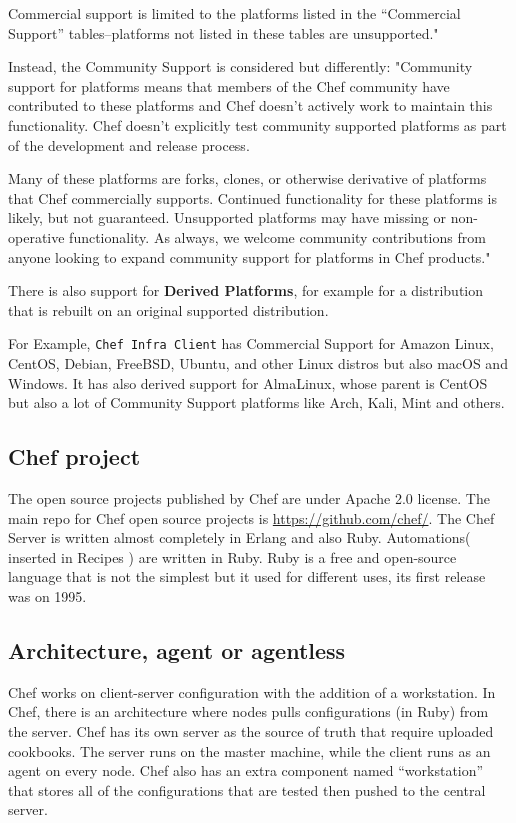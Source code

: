 \documentclass[12pt,a4paper,openright,twoside]{book}
\begin{document}
Commercial support is limited to the platforms listed in the “Commercial Support” tables–platforms not listed in these tables are unsupported."\cite{chefDocPlatforms}

Instead, the Community Support is considered but differently:
"Community support for platforms means that members of the Chef community have contributed to these platforms and Chef doesn’t actively work to maintain this functionality. Chef doesn’t explicitly test community supported platforms as part of the development and release process.


Many of these platforms are forks, clones, or otherwise derivative of platforms that Chef commercially supports. Continued functionality for these platforms is likely, but not guaranteed. Unsupported platforms may have missing or non-operative functionality. As always, we welcome community contributions from anyone looking to expand community support for platforms in Chef products."\cite{chefDocPlatforms}


There is also support for \textbf{Derived Platforms}, for example for a distribution that is rebuilt on an original supported distribution.

For Example, \texttt{Chef Infra Client} has Commercial Support for Amazon Linux, CentOS, Debian, FreeBSD, Ubuntu, and other Linux distros but also macOS and Windows.
It has also derived support for AlmaLinux, whose parent is CentOS but also a lot of Community Support platforms like Arch, Kali, Mint and others.

\subsection{Chef project}
The open source projects published by Chef are under Apache 2.0 license.
The main repo for Chef open source projects is \url{https://github.com/chef/}.
The Chef Server is written almost completely in Erlang and also Ruby.
Automations( inserted in Recipes ) are written in Ruby. Ruby is a free and open-source language that is not the simplest but it used for different uses, its first release was on 1995.

\subsection{Architecture, agent or agentless}
Chef works on client-server configuration with the addition of a workstation.
In Chef, there is an architecture where nodes pulls configurations (in Ruby) from the server. Chef has its own server as the source of truth that require uploaded cookbooks.
The server runs on the master machine, while the client runs as an agent on every node. Chef also has an extra component named “workstation” that stores all of the configurations that are tested then pushed to the central server.
\end{document}
